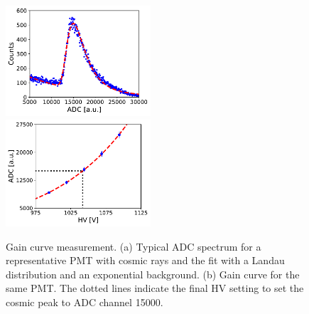 \documentclass[3p,twocolumn]{elsarticle}
\begin{document}
\begin{figure}[tbh!]
			\includegraphics[width=0.48\textwidth]{fig15a-adcfit.pdf}\\
					\subcaption{}
                  			\label{fig:adc-spectrum}
			\includegraphics[width=0.48\textwidth]{fig15b-gaincurve.pdf}
			\subcaption{}
		\label{fig:gain-curve}
		\caption{Gain curve measurement. (a) Typical ADC spectrum for a representative PMT with cosmic rays
                  and the fit with a Landau distribution and an exponential background. (b) Gain curve for the same
                  PMT. The dotted lines indicate the final HV setting to set the cosmic peak to ADC channel 15000. }

\end{figure}
\end{document}
